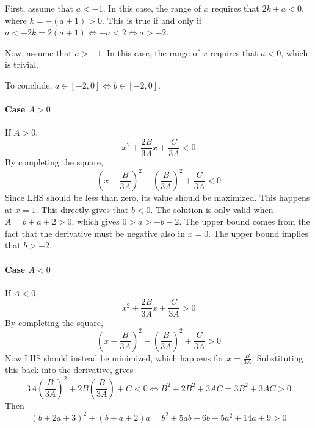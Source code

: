 \documentclass[a4paper, 11pt]{scrartcl}
\begin{document}
First, assume that $a < -1$. In this case, the range of $x$ requires that $2k + a < 0$, where $k = -(a + 1) > 0$. This is true if and only if $a < -2k = 2(a + 1) \iff -a < 2 \iff a > -2$.

Now, assume that $a > -1$. In this case, the range of $x$ requires that $a < 0$, which is trivial.

To conclude, $a\in[-2, 0] \iff b\in[-2, 0]$.


\paragraph{Case $A>0$}
If $A>0$,
\[
x^2 +\frac{2B}{3A}x + \frac{C}{3A} < 0
\]
By completing the square,
\[
 \left(x - \frac{B}{3A}\right)^2 - \left(\frac{B}{3A}\right)^2 + \frac{C}{3A} < 0
\]
Since LHS should be less than zero, its value should be maximized. This happens at $x = 1$. This directly gives that $b < 0$. The solution is only valid when $A = b+a+2 > 0$, which gives $0 > a > -b - 2$. The upper bound comes from the fact that the derivative must be negative also in $x = 0$. The upper bound implies that $b > -2$.

\paragraph{Case $A < 0$} If $A < 0$,
\[
x^2 +\frac{2B}{3A}x + \frac{C}{3A} > 0
\]
By completing the square,
\[
 \left(x - \frac{B}{3A}\right)^2 - \left(\frac{B}{3A}\right)^2 + \frac{C}{3A} > 0
\]
Now LHS should instead be minimized, which happens for $x = \frac{B}{3A}$. Substituting this back into the derivative, gives
\[
 3A\left(\frac{B}{3A}\right)^2 + 2B\left(\frac{B}{3A}\right) + C < 0 \iff B^2 + 2B^2 + 3AC = 3B^2 + 3AC > 0
\]
Then
\[
(b+2a+3)^2 + (b+a+2)a = {{b}^{2}}+ 5 ab + 6b + 5 {{a}^{2}}+14 a+9 > 0
\]
\end{document}
